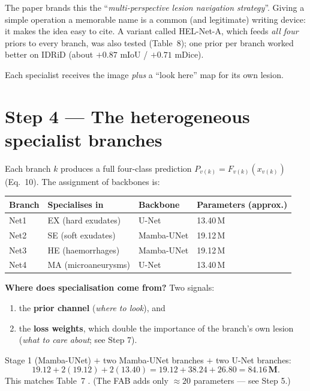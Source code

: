 \documentclass[11pt,a4paper]{article}
\newcommand{\cmark}{\textcolor{okgreen}{\ding{51}}}
\begin{document}
The paper brands this the ``\emph{multi-perspective lesion navigation strategy}''. Giving a simple
operation a memorable name is a common (and legitimate) writing device: it makes the idea easy to
cite. A variant called HEL-Net-A, which feeds \emph{all four} priors to every branch, was also tested
(Table~8); one prior per branch worked better on IDRiD (about $+0.87$ mIoU / $+0.71$ mDice).

\begin{recap}
Each specialist receives the image \emph{plus} a ``look here'' map for its own lesion.
\end{recap}

\section{Step 4 --- The heterogeneous specialist branches}
Each branch $k$ produces a full four-class prediction $P_{v(k)} = F_{v(k)}(x_{v(k)})$ (Eq.~10).
The assignment of backbones is:
\begin{center}
\small
\begin{tabular}{@{}llll@{}}
\toprule
Branch & Specialises in & Backbone & Parameters (approx.)\\
\midrule
Net1 & EX (hard exudates) & U-Net & 13.40\,M\\
Net2 & SE (soft exudates) & Mamba-UNet & 19.12\,M\\
Net3 & HE (haemorrhages) & Mamba-UNet & 19.12\,M\\
Net4 & MA (microaneurysms) & U-Net & 13.40\,M\\
\bottomrule
\end{tabular}
\end{center}

\textbf{Where does specialisation come from?} Two signals:
\begin{enumerate}
\item the \textbf{prior channel} (\emph{where to look}), and
\item the \textbf{loss weights}, which double the importance of the branch's own lesion (\emph{what to care about}; see Step 7).
\end{enumerate}

\begin{worked}
Stage 1 (Mamba-UNet) $+$ two Mamba-UNet branches $+$ two U-Net branches:
\[
19.12 + 2(19.12) + 2(13.40) = 19.12 + 38.24 + 26.80 = \mathbf{84.16\,M}.
\]
This matches Table~7 \cmark. (The FAB adds only $\approx 20$ parameters --- see Step 5.)
\end{worked}
\end{document}
